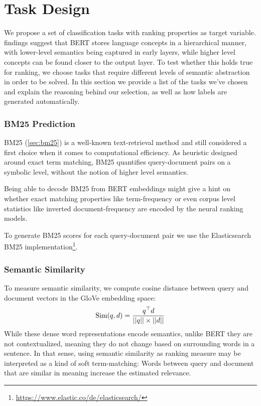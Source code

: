 \section{Task Design}
\label{sec:tasks}
We propose a set of classification tasks with ranking properties as target variable. \cite{tenney-etal-2019-bert} findings suggest that BERT stores language concepts in a hierarchical manner, with lower-level semantics being captured in early layers, while higher level concepts can be found closer to the output layer. To test whether this holds true for ranking, we choose tasks that require different levels of semantic abstraction in order to be solved. In this section we provide a list of the tasks we've chosen and explain the reasoning behind our selection, as well as how labels are generated automatically.

\subsubsection{BM25 Prediction}
BM25 (\autoref{sec:bm25}) is a well-known text-retrieval method and still considered a first choice when it comes to computational efficiency. As heuristic designed around exact term matching, BM25 quantifies query-document pairs on a symbolic level, without the notion of higher level semantics.

Being able to decode BM25 from BERT embeddings might give a hint on whether exact matching properties like term-frequency or even corpus level statistics like inverted document-frequency are encoded by the neural ranking models.

To generate BM25 scores for each query-document pair we use the Elasticsearch BM25 implementation\footnote{\url{https://www.elastic.co/de/elasticsearch/}}.

\subsubsection{Semantic Similarity}
To measure semantic similarity, we compute cosine distance between query and document vectors in the GloVe\cite{pennington2014glove} embedding space:
\begin{equation}
    \label{eq:sem_sim}
    \text{Sim}(q, d) = \frac{q^\top d}{||q|| \times ||d||}
\end{equation}
While these dense word representations encode semantics, unlike BERT they are not contextualized, meaning they do not change based on surrounding words in a sentence. In that sense, using semantic similarity as ranking measure may be interpreted as a kind of soft term-matching: Words between query and document that are similar in meaning increase the estimated relevance.

